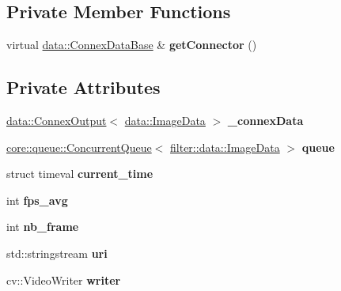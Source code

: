 \subsection*{Private Member Functions}
\begin{DoxyCompactItemize}
\item 
\mbox{\label{classfilter_1_1algos_1_1_stream_result_filter_ae3868147f0e2ce62bfc9ed53aa61c0bf}} 
virtual \hyperlink{classfilter_1_1data_1_1_connex_data_base}{data\+::\+Connex\+Data\+Base} \& {\bfseries get\+Connector} ()
\end{DoxyCompactItemize}
\subsection*{Private Attributes}
\begin{DoxyCompactItemize}
\item 
\mbox{\label{classfilter_1_1algos_1_1_stream_result_filter_adc94c69814a5da9f43a4ebc003d0c8d8}} 
\hyperlink{classfilter_1_1data_1_1_connex_output}{data\+::\+Connex\+Output}$<$ \hyperlink{classfilter_1_1data_1_1_image_data}{data\+::\+Image\+Data} $>$ {\bfseries \+\_\+connex\+Data}
\item 
\mbox{\label{classfilter_1_1algos_1_1_stream_result_filter_a592158e7897f4e9f6f5fde741003c8f2}} 
\hyperlink{classcore_1_1queue_1_1_concurrent_queue}{core\+::queue\+::\+Concurrent\+Queue}$<$ \hyperlink{classfilter_1_1data_1_1_image_data}{filter\+::data\+::\+Image\+Data} $>$ {\bfseries queue}
\item 
\mbox{\label{classfilter_1_1algos_1_1_stream_result_filter_acdffd4ec3a0b6a5b2b09049bf2cc3c18}} 
struct timeval {\bfseries current\+\_\+time}
\item 
\mbox{\label{classfilter_1_1algos_1_1_stream_result_filter_a59a43c6133718050eb493049ea044661}} 
int {\bfseries fps\+\_\+avg}
\item 
\mbox{\label{classfilter_1_1algos_1_1_stream_result_filter_ad75a09b7d6bc750ce9a87b914cfb3e29}} 
int {\bfseries nb\+\_\+frame}
\item 
\mbox{\label{classfilter_1_1algos_1_1_stream_result_filter_a907e2c73741e9ec55685dbe58e7a942a}} 
std\+::stringstream {\bfseries uri}
\item 
\mbox{\label{classfilter_1_1algos_1_1_stream_result_filter_ac0698efb9338f169fa360945ca457f4f}} 
cv\+::\+Video\+Writer {\bfseries writer}
\end{DoxyCompactItemize}
